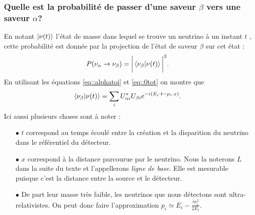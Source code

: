       \subsubsection{Quelle est la probabilité de passer d'une saveur $\beta$ vers une saveur $\alpha$?}
        En notant $\ket{\nu(t)}$ l'état de masse dans lequel se trouve un neutrino à un instant $t$ , cette probabilité est donnée par la projection de l'état de saveur $\beta$ sur cet état :
        \begin{equation}
          P(\nu_{\alpha}\to\nu_{\beta})=\bigg|\braket{\nu_{\beta}}{\nu(t)}\bigg|^2.
        \end{equation}
        En utilisant les équations \eqref{eq::alphatoi} et \eqref{eq::0tot} on montre que
        \begin{equation}
          \braket{\nu_{\beta}}{\nu(t)} = \sum_i U_{\alpha i}^*U_{\beta i} e^{-i(E_i\cdot t - p_i\cdot x)}.
        \end{equation}
        Ici aussi plusieurs choses sont à noter : 
        \begin{itemize}
          \item[$\bullet$] $t$ correspond au temps écoulé entre la création et la disparition du neutrino dans le référentiel du détecteur.
          \item[$\bullet$] $x$ correspond à la distance parcourue par le neutrino. Nous la noterons $L$ dans la suite du texte et l'appellerons \textit{ligne de base}. Elle est mesurable puisque c'est la distance entre la source et le détecteur.
          \item[$\bullet$] De part leur masse très faible, les neutrinos que nous détectons sont ultra-relativistes. On peut donc faire l'approximation $p_i \simeq E_i - \frac{m_i^2}{2E_i}$.
        \end{itemize}
        
